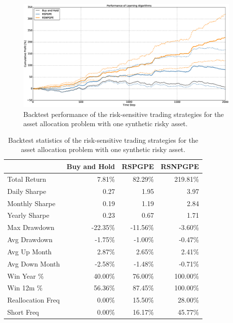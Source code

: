 \begin{figure}[t!]
	\centering
	\includegraphics[width=1.0\textwidth]{Images/8_5_single_synthetic_sensitive_performance}
	\caption[Backtest performance with one synthetic risky asset]{Backtest performance of the risk-sensitive trading strategies for the asset allocation problem with one synthetic risky asset.}
	\label{fig:single_synthetic_sensitive_performance}
\end{figure}

\begin{table}[h!]
\centering
\begin{tabular}{@{}lrrr@{}}
\toprule
                  & Buy and Hold & RSPGPE   & RSNPGPE  \\ \midrule
Total Return      & 7.81\%       & 82.29\%  & 219.81\% \\
Daily Sharpe      & 0.27         & 1.95     & 3.97     \\
Monthly Sharpe    & 0.19         & 1.19     & 2.84     \\
Yearly Sharpe     & 0.23         & 0.67     & 1.71     \\
Max Drawdown      & -22.35\%     & -11.56\% & -3.60\%  \\
Avg Drawdown      & -1.75\%      & -1.00\%  & -0.47\%  \\
Avg Up Month      & 2.87\%       & 2.65\%   & 2.41\%   \\
Avg Down Month    & -2.58\%      & -1.48\%  & -0.71\%  \\
Win Year \%       & 40.00\%      & 76.00\%  & 100.00\% \\
Win 12m \%        & 56.36\%      & 87.45\%  & 100.00\% \\
Reallocation Freq & 0.00\%       & 15.50\%  & 28.00\%  \\
Short Freq        & 0.00\%       & 16.17\%  & 45.77\%  \\ \bottomrule
\end{tabular}
\caption[Backtest statistics for risk-sensitive learning with one synthetic risky asset]{Backtest statistics of the risk-sensitive trading strategies for the asset allocation problem with one synthetic risky asset.}
\label{tab:single_synthetic_sensitive_performance}
\end{table}

